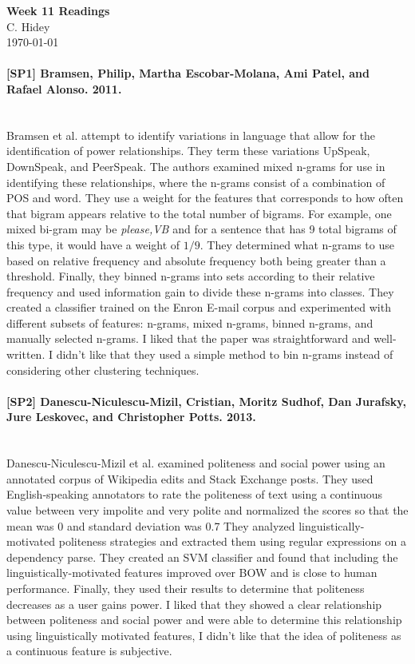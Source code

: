 \documentclass[12pt]{article}
\begin{document}
\begin{center}
  \textbf{Week 11 Readings} \\
  C. Hidey \\
  \today
\end{center}

\paragraph{{\bf [SP1] Bramsen, Philip, Martha Escobar-Molana, Ami Patel, and Rafael Alonso. 2011.}}
\text{} \\
Bramsen et al. attempt to identify variations in language that allow for the identification of power relationships.  They term these variations UpSpeak, DownSpeak, and PeerSpeak.
The authors examined mixed n-grams for use in identifying these relationships, where the n-grams consist of a combination of POS and word.
They use a weight for the features that corresponds to how often that bigram appears relative to the total number of bigrams.  For example, one mixed bi-gram may be \textit{please,VB}
and for a sentence that has 9 total bigrams of this type, it would have a weight of $1/9$.
They determined what n-grams to use based on relative frequency and absolute frequency both being greater than a threshold.
Finally, they binned n-grams into sets according to their relative frequency and used information gain to divide these n-grams into classes.
They created a classifier trained on the Enron E-mail corpus and experimented with different subsets of features: n-grams, mixed n-grams, binned n-grams, and manually selected n-grams.
I liked that the paper was straightforward and well-written.
I didn't like that they used a simple method to bin n-grams instead of considering other clustering techniques.

\paragraph{{\bf [SP2] Danescu-Niculescu-Mizil, Cristian, Moritz Sudhof, Dan Jurafsky, Jure Leskovec, and Christopher Potts. 2013.}}
\text{} \\
Danescu-Niculescu-Mizil et al. examined politeness and social power 
using an annotated corpus of Wikipedia edits and Stack Exchange posts.
They used English-speaking annotators to rate the politeness of text using a continuous value between very impolite and very polite and normalized the scores
so that the mean was 0 and standard deviation was 0.7
They analyzed linguistically-motivated politeness strategies and extracted them using regular expressions on a dependency parse.
They created an SVM classifier and found that including the linguistically-motivated features improved over BOW and is close to human performance.
Finally, they used their results to determine that politeness decreases as a user gains power.
I liked that they showed a clear relationship between politeness and social power and were able to determine this relationship using linguistically motivated features,
I didn't like that the idea of politeness as a continuous feature is subjective.
\end{document}
